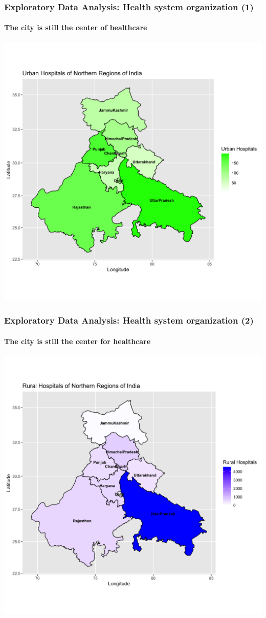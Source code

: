 \documentclass{beamer}
\begin{document}
{\begin{frame}
\end{frame}
\begin{frame}
	\frametitle{Exploratory Data Analysis: Health system organization (1)}
	\framesubtitle{The city is still the center of healthcare}
	\center \includegraphics[scale = 0.1]{urbanh.png}
\end{frame}
\begin{frame}
	\frametitle{Exploratory Data Analysis: Health system organization (2)}
	\framesubtitle{The city is still the center for healthcare}
	\center \includegraphics[scale = 0.1]{ruralh.png}

\end{frame}}
\end{document}
